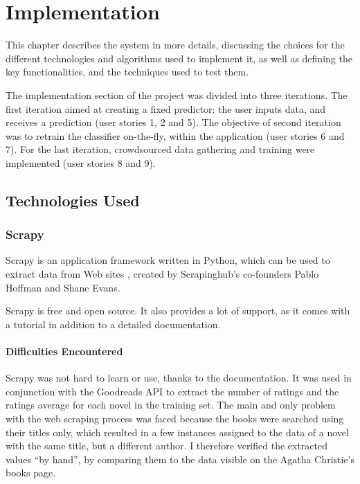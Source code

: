 \documentclass{mproj}
\begin{document}
\chapter{Implementation}\label{implementation}

This chapter describes the system in more details, discussing the choices for the different technologies and algorithms used to implement it, as well as defining the key functionalities, and the techniques used to test them. \par 

The implementation section of the project was divided into three iterations. 
The first iteration aimed at creating a fixed predictor: the user inputs data, and receives a prediction (user stories 1, 2 and 5). 
The objective of second iteration was to retrain the classifier on-the-fly, within the application (user stories 6 and 7). 
For the last iteration, crowdsourced data gathering and training were implemented (user stories 8 and 9).

\section{Technologies Used}

\subsection{Scrapy}\label{scrapy}

Scrapy is an application framework written in Python, which can be used to extract data from Web sites \cite{scrapy}, created by Scrapinghub's co-founders Pablo Hoffman and Shane Evans. \cite{scrapinghub}

Scrapy is free and open source. It also provides a lot of support, as it comes with a tutorial in addition to a detailed documentation. \cite{scrapydoc}

\subsubsection*{Difficulties Encountered}

Scrapy was not hard to learn or use, thanks to the documentation. It was used in conjunction with the Goodreads API \cite{goodreadsapi} to extract the number of ratings and the ratings average for each novel in the training set. The main and only problem with the web scraping process was faced because the books were searched using their titles only, which resulted in a few instances assigned to the data of a novel with the same title, but a different author. I therefore verified the extracted values ``by hand'', by comparing them to the data visible on the Agatha Christie's books page. \cite{goodreads}
\end{document}
